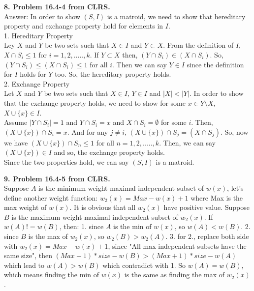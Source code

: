 \documentclass{article}
\begin{document}
\noindent
\textbf{8. Problem 16.4-4 from CLRS.} \\ \newline
Answer: In order to show $(S,I)$ is a matroid, we need to show that hereditary property and exchange property hold for elements in $I$. \\
1. Hereditary Property \\
Ley $X$ and $Y$ be two sets such that $X \in I$ and $Y \subset X$. From the definition of $I$, $X \cap S_i \leq 1$ for $i = 1, 2, ....., k$. If $Y \subset X$ then, $(Y \cap S_i) \in (X \cap S_i)$. So, $(Y \cap S_i) \leq (X \cap S_i) \leq 1$ for all $i$. Then we can say $Y \in I$ since the definition for $I$ holds for $Y$ too. So, the hereditary property holds. \\
2. Exchange Property \\
Let $X$ and $Y$ be two sets such that $X \in I$, $Y \in I$ and $|X| < |Y|$. In order to show that the exchange property holds, we need to show for some $x \in Y \setminus X$, $X \cup \{x\} \in I$.\\
 Assume $|Y \cap S_i| = 1$ and $Y \cap S_i = x$ and $X \cap S_i = \emptyset$ for some $i$. Then, $(X \cup \{x\}) \cap S_i = x$. And for any $j \neq i$, $(X \cup \{x\}) \cap S_j = (X \cap S_j)$. So, now we have $(X \cup \{x\}) \cap S_n \leq 1$ for all $n = 1, 2, ....., k$. Then, we can say  $(X \cup \{x\}) \in I$ and so, the exchange property holds.\\
Since the two properties hold, we can say $(S, I)$ is a matroid. \\ \newline

\noindent
\textbf{9. Problem 16.4-5 from CLRS.} \\ \newline
Suppose $A$ is the minimum-weight maximal independent subset of $w(x)$, let's define another weight function: $w_2(x) = Max - w(x) + 1$ where Max is the max weight of $w(x)$. It is obvious that all $w_2(x)$ have positive value. Suppose  $B$ is the maximum-weight maximal independent subset of $w_2(x)$. If $w(A) != w(B)$, then: 1. since $A$ is the min of  $w(x)$, so $w(A) < w(B)$. 2. since $B$ is the max of  $w_2(x)$, so $w_2(B) > w_2(A)$. 3. for 2., replace both side with $w_2(x) = Max - w(x) + 1$, since "All max independent subsets have the same size", then $ (Max+1)*size - w(B) >  (Max+1)*size - w(A)$ which lead to $w(A) > w(B)$ which contradict with 1. So $w(A) = w(B)$, which means finding the min of $w(x)$ is the same as finding the max of  $w_2(x)$.
\newline
 
\end{document}
